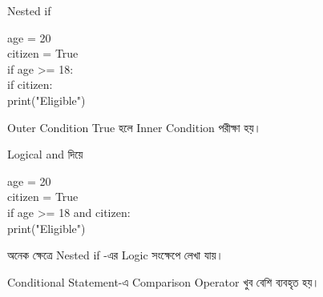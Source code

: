 \noindent
\begin{minipage}[t]{0.49\linewidth}

\begin{sideexamplebox}{Nested \textenglish{\ttfamily if}}

\begin{sidecodebox}
\begin{english}
\ttfamily
age = 20\\
citizen = True\\
if age >= 18:\\
\hspace*{4mm}if citizen:\\
\hspace*{8mm}print("Eligible")
\end{english}
\end{sidecodebox}

Outer Condition True হলে Inner Condition পরীক্ষা হয়।

\end{sideexamplebox}

\end{minipage}
\hfill
\begin{minipage}[t]{0.49\linewidth}

\begin{sideexamplebox}{Logical \textenglish{\ttfamily and} দিয়ে}

\begin{sidecodebox}
\begin{english}
\ttfamily
age = 20\\
citizen = True\\
if age >= 18 and citizen:\\
\hspace*{4mm}print("Eligible")
\end{english}
\end{sidecodebox}

অনেক ক্ষেত্রে Nested
\textenglish{\ttfamily if}
-এর Logic সংক্ষেপে লেখা যায়।

\end{sideexamplebox}

\end{minipage}



Conditional Statement-এ Comparison Operator খুব বেশি ব্যবহৃত হয়।

